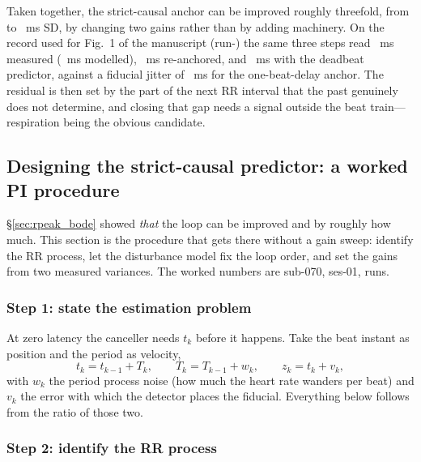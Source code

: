\documentclass[11pt]{article}
\begin{document}
Taken together, the strict-causal anchor can be improved roughly threefold, from \rbModelAsBuilt{}
to \rbModelLastRR{}~ms SD, by changing two gains rather than by adding machinery. On the record used
for Fig.~1 of the manuscript (run-\rbHlRun{}) the same three steps read \rbHlPll{}~ms measured
(\rbHlModel{}~ms modelled), \rbHlOl{}~ms re-anchored, and \rbHlPrev{}~ms with the deadbeat
predictor, against a fiducial jitter of \rbHlFidJit{}~ms for the one-beat-delay anchor. The residual
is then set by the part of the next RR interval that the past genuinely does not determine, and
closing that gap needs a signal outside the beat train---respiration being the obvious candidate.



\subsection{Designing the strict-causal predictor: a worked PI procedure}
\label{sec:pll_design}

\S\ref{sec:rpeak_bode} showed \emph{that} the loop can be improved and by roughly how much. This
section is the procedure that gets there without a gain sweep: identify the RR process, let the
disturbance model fix the loop order, and set the gains from two measured variances. The worked
numbers are sub-070, ses-01, \pdNruns{} runs.

\subsubsection*{Step 1: state the estimation problem}

At zero latency the canceller needs $t_k$ before it happens. Take the beat instant as position and
the period as velocity,
\begin{equation}
t_k = t_{k-1} + T_k,
\qquad
T_k = T_{k-1} + w_k,
\qquad
z_k = t_k + v_k,
\label{eq:statemodel}
\end{equation}
with $w_k$ the period process noise (how much the heart rate wanders per beat) and $v_k$ the error
with which the detector places the fiducial. Everything below follows from the ratio of those two.

\subsubsection*{Step 2: identify the RR process}
\end{document}
